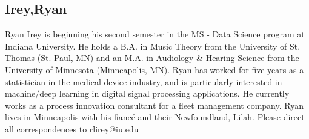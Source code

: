 \subsection{Irey,Ryan}

Ryan Irey is beginning his second semester in the MS - Data Science
program at Indiana University.  He holds a B.A. in Music Theory from
the University of St. Thomas (St. Paul, MN) and an M.A. in Audiology \&
Hearing Science from the University of Minnesota (Minneapolis,
MN). Ryan has worked for five years as a statistician in the medical
device industry, and is particularly interested in machine/deep
learning in digital signal processing applications. He currently works
as a process innovation consultant for a fleet management
company. Ryan lives in Minneapolis with his fiancé and their
Newfoundland, Lilah. Please direct all correspondences to
rlirey@iu.edu
